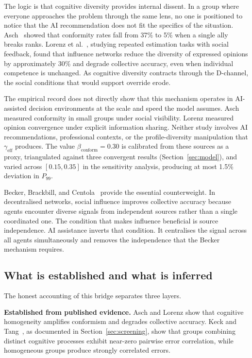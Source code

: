 \documentclass[11pt,a4paper]{article}
\begin{document}
The logic is that cognitive diversity provides internal dissent. In a group
where everyone approaches the problem through the same lens, no one is
positioned to notice that the AI recommendation does not fit the specifics of
the situation. Asch~\cite{asch_guetzkow_1951} showed that conformity rates
fall from 37\% to 5\% when a single ally breaks ranks. Lorenz et
al.~\cite{lorenz_pnas_2011}, studying repeated estimation tasks with social
feedback, found that influence networks reduce the diversity of expressed
opinions by approximately 30\% and degrade collective accuracy, even when
individual competence is unchanged. As cognitive diversity contracts through
the D-channel, the social conditions that would support override erode.

The empirical record does not directly show that this mechanism operates in
AI-assisted decision environments at the scale and speed the model assumes.
Asch measured conformity in small groups under social visibility. Lorenz
measured opinion convergence under explicit information sharing. Neither
study involves AI recommendations, professional contexts, or the
profile-diversity manipulation that $\gamma_{\text{eff}}$ produces. The
value $\beta_{\text{conform}} = 0.30$ is calibrated from these sources as a
proxy, triangulated against three convergent results
(Section~\ref{sec:model}), and varied across $[0.15, 0.35]$ in the
sensitivity analysis, producing at most 1.5\% deviation in
$P_{99}$.

Becker, Brackbill, and Centola~\cite{becker_pnas_2017} provide the
essential counterweight. In decentralised networks, social influence improves
collective accuracy because agents encounter diverse signals from independent
sources rather than a single coordinated one. The condition that makes
influence beneficial is source independence. AI assistance inverts that
condition. It centralises the signal across all agents simultaneously and
removes the independence that the Becker mechanism requires.

\subsection{What is established and what is inferred}

The honest accounting of this bridge separates three layers.

\textbf{Established from published evidence.} Asch and Lorenz show that
cognitive homogeneity amplifies conformism and degrades collective accuracy.
Keck and Tang~\cite{keck_psychsci_2020}, as documented in
Section~\ref{sec:screening}, show that groups combining distinct cognitive
processes exhibit near-zero pairwise error correlation, while homogeneous
groups produce strongly correlated errors.
\end{document}
